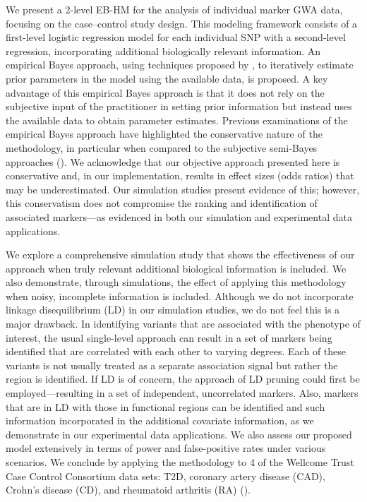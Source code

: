 \documentclass[oupdraft]{bio}
\begin{document}
We present a 2-level EB-HM for the analysis of individual
marker GWA data, focusing on the case--control study design.
This modeling framework consists of a first-level logistic
regression model for each individual SNP with a second-level
regression, incorporating additional biologically relevant
information. An empirical Bayes approach, using techniques
proposed by
\citet{Barlow:1972},
to iteratively estimate prior parameters in the model using
the available data, is proposed. A key advantage of this
empirical Bayes approach is that it does not rely on the
subjective input of the practitioner in setting prior
information but instead uses the available data to obtain
parameter estimates. Previous examinations of the empirical
Bayes approach have highlighted the conservative nature of
the methodology, in particular when compared to the subjective
semi-Bayes approaches
(\citealp{Castelloe_Zimmerman:2002,Schwender:2007}).
We acknowledge that our objective approach presented here
is conservative and, in our implementation, results in
effect sizes (odds ratios) that may be underestimated. Our
simulation studies present evidence of this; however, this
conservatism does not compromise the ranking and identification
of associated markers---as evidenced in both our simulation and
experimental data applications.

We explore a comprehensive simulation study that shows the
effectiveness of our approach when truly relevant additional
biological information is included. We also demonstrate, through
simulations, the effect of applying this methodology when noisy,
incomplete information is included. Although we do not incorporate
linkage disequilibrium (LD) in our simulation studies, we do not
feel this is a major drawback. In identifying variants that are
associated with the phenotype of interest, the usual single-level
approach can result in a set of markers being identified that are
correlated with each other to varying degrees. Each of these
variants is not usually treated as a separate association signal
but rather the region is identified. If LD is of concern, the
approach of LD pruning could first be employed---resulting in a
set of independent, uncorrelated markers. Also, markers that are
in LD with those in functional regions can be identified and such
information incorporated in the additional covariate information,
as we demonstrate in our experimental data applications. We also
assess our proposed model extensively in terms of power and
false-positive rates under various scenarios. We conclude by
applying the methodology to 4 of the Wellcome Trust Case
Control Consortium data sets: T2D, coronary artery disease
(CAD), Crohn's disease (CD), and rheumatoid arthritis (RA)
(\citealp{allison2006}).
\end{document}

